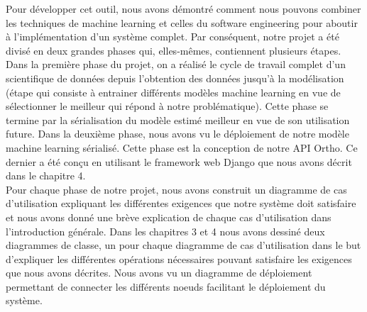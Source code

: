 \documentclass[12pt, french]{report}
\begin{document}
Pour développer cet outil, nous avons démontré comment nous pouvons combiner les techniques de machine learning et celles du software engineering pour aboutir à l'implémentation d'un système complet. Par conséquent, notre projet a été divisé en deux grandes phases qui, elles-mêmes, contiennent plusieurs étapes. Dans la première phase du projet, on a réalisé le cycle de travail complet d'un scientifique de données depuis l'obtention des données jusqu'à la modélisation (étape qui consiste à entrainer différents modèles machine learning en vue  de sélectionner le meilleur qui répond à notre problématique). Cette phase se termine par la sérialisation du modèle estimé meilleur en vue de son utilisation future. Dans la deuxième phase, nous avons vu le déploiement de notre modèle machine learning sérialisé. Cette phase est la conception de notre API Ortho. Ce dernier a été conçu en utilisant le framework web Django que nous avons décrit dans le chapitre 4. \\

Pour chaque phase de notre projet, nous avons construit un diagramme de cas d'utilisation expliquant les différentes exigences que notre système doit satisfaire et nous avons donné une brève explication de chaque cas d'utilisation dans l'introduction générale. Dans les chapitres 3 et 4 nous avons dessiné deux diagrammes de classe, un pour chaque diagramme de cas d'utilisation dans le but d'expliquer les différentes opérations nécessaires pouvant satisfaire les exigences que nous avons décrites. Nous avons vu un diagramme de déploiement permettant de connecter les différents noeuds facilitant le déploiement du système. 
\end{document}
